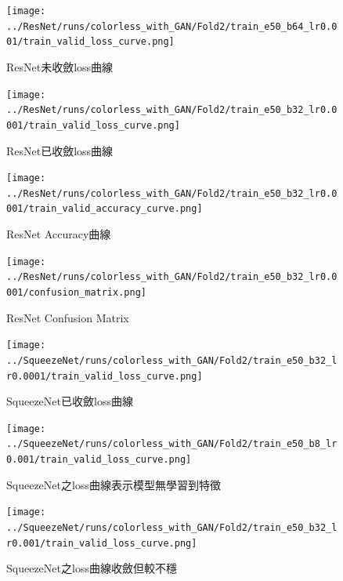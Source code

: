     \begin{figure}[!t]
        \centering
        \texttt{[image: ../ResNet/runs/colorless\_with\_GAN/Fold2/train\_e50\_b64\_lr0.001/train\_valid\_loss\_curve.png]}
        \caption{ResNet未收斂loss曲線}
        \label{fig:ResNet_unconvergence_loss_curve}
    \end{figure}
    \begin{figure}[!t]
        \centering
        \texttt{[image: ../ResNet/runs/colorless\_with\_GAN/Fold2/train\_e50\_b32\_lr0.0001/train\_valid\_loss\_curve.png]}
        \caption{ResNet已收斂loss曲線}
        \label{fig:ResNet_convergence_loss_curve}
    \end{figure}
    \begin{figure}[!t]
        \centering
        \texttt{[image: ../ResNet/runs/colorless\_with\_GAN/Fold2/train\_e50\_b32\_lr0.0001/train\_valid\_accuracy\_curve.png]}
        \caption{ResNet Accuracy曲線}
        \label{fig:ResNet_accuracy_curve}
    \end{figure}
    \begin{figure}[!t]
        \centering
        \texttt{[image: ../ResNet/runs/colorless\_with\_GAN/Fold2/train\_e50\_b32\_lr0.0001/confusion\_matrix.png]}
        \caption{ResNet Confusion Matrix}
        \label{fig:ResNet_confuson_matrix}
    \end{figure}
    \begin{figure}[!t]
        \centering
        \texttt{[image: ../SqueezeNet/runs/colorless\_with\_GAN/Fold2/train\_e50\_b32\_lr0.0001/train\_valid\_loss\_curve.png]}
        \caption{SqueezeNet已收斂loss曲線}
        \label{fig:SqueezeNet_convergence_loss_curve}
    \end{figure}
    \begin{figure}[!t]
        \centering
        \texttt{[image: ../SqueezeNet/runs/colorless\_with\_GAN/Fold2/train\_e50\_b8\_lr0.001/train\_valid\_loss\_curve.png]}
        \caption{SqueezeNet之loss曲線表示模型無學習到特徵}
        \label{fig:SqueezeNet_unconvergence_loss_curve}
    \end{figure}
    \begin{figure}[!t]
        \centering
        \texttt{[image: ../SqueezeNet/runs/colorless\_with\_GAN/Fold2/train\_e50\_b32\_lr0.001/train\_valid\_loss\_curve.png]}
        \caption{SqueezeNet之loss曲線收斂但較不穩}
        \label{fig:SqueezeNet_unconvergence_loss_curve_1e-3}
    \end{figure}
